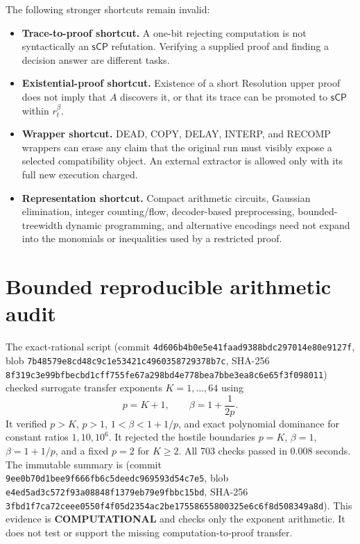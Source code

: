 \documentclass[11pt]{article}
\newcommand{\sCP}{\mathsf{sCP}}
\newcommand{\COMP}{\textbf{COMPUTATIONAL}}
\begin{document}
The following stronger shortcuts remain invalid:
\begin{itemize}
\item \textbf{Trace-to-proof shortcut.} A one-bit rejecting computation is
  not syntactically an $\sCP$ refutation. Verifying a supplied proof and
  finding a decision answer are different tasks.
\item \textbf{Existential-proof shortcut.} Existence of a short Resolution
  upper proof does not imply that $A$ discovers it, or that its trace can be
  promoted to $\sCP$ within $r_t^\beta$.
\item \textbf{Wrapper shortcut.} DEAD, COPY, DELAY, INTERP, and RECOMP
  wrappers can erase any claim that the original run must visibly expose a
  selected compatibility object. An external extractor is allowed only with
  its full new execution charged.
\item \textbf{Representation shortcut.} Compact arithmetic circuits,
  Gaussian elimination, integer counting/flow, decoder-based preprocessing,
  bounded-treewidth dynamic programming, and alternative encodings need not
  expand into the monomials or inequalities used by a restricted proof.
\end{itemize}

\section{Bounded reproducible arithmetic audit}
The exact-rational script
(commit \texttt{4d606b4b0e5e41faad9388bdc297014e80e9127f}, blob
\texttt{7b48579e8cd48c9c1e53421c4960358729378b7c}, SHA-256
\texttt{8f319c3e99bfbecbd1cff755fe67a298bd4e778bea7bbe3ea8c6e65f3f098011})
checked surrogate transfer exponents $K=1,\ldots,64$ using
\[
 p=K+1,\qquad \beta=1+\frac1{2p}.
\]
It verified $p>K$, $p>1$, $1<\beta<1+1/p$, and exact polynomial dominance
for constant ratios $1,10,10^6$. It rejected the hostile boundaries $p=K$,
$\beta=1$, $\beta=1+1/p$, and a fixed $p=2$ for $K\ge2$. All 703 checks
passed in 0.008 seconds. The immutable summary is
(commit \texttt{9ee0b70d1bee9f666fb6c5deedc969593d54c7e5}, blob
\texttt{e4ed5ad3c572f93a08848f1379eb79e9fbbc15bd}, SHA-256
\texttt{3fbd1f7ca72ceee0550f4f05d2354ac2be17558655800325e6c6f8d508349a8d}).
This evidence is \COMP{} and checks only the exponent arithmetic. It does
not test or support the missing computation-to-proof transfer.
\end{document}
